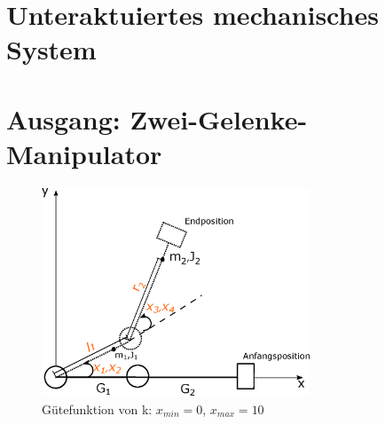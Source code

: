 \section{Unteraktuiertes mechanisches System}
\label{Unteraktuiertes_mechanisches_System}

\section{Ausgang: Zwei-Gelenke-Manipulator}
\label{Ausgang_Zwei_Gelenke_Manipulator}
\begin{figure}
	\centering
	\includegraphics[width=8cm]{bild/modul/Unteraktuiertes-System.eps}
	\caption{Gütefunktion von k: $x_{min}=0$, $x_{max}=10$}
	\label{fig:Gütefunktion_von_k}
\end{figure}